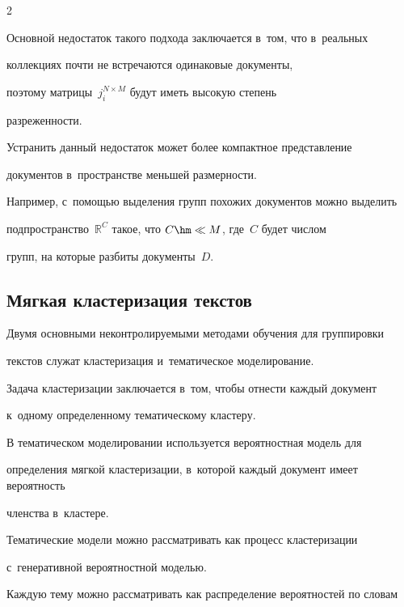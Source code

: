 \begin{multicols}{2}
{    


    }


    


    Основной недостаток такого подхода заключается в~том, что в~реальных 


коллекциях почти не встречаются одинаковые документы,


поэтому мат\-ри\-цы~$j_i^{N \times M}$ будут иметь высокую степень 


разреженности.


        Устранить данный недостаток может более компактное представление 


документов в~пространстве меньшей размерности.


    Например, с~помощью выделения групп похожих документов можно выделить 


подпространство~$\mathbb{R}^C$ такое, что $C \hm\ll M$, где~$C$  будет числом 


групп, на которые разбиты документы~$D$.


    


    \subsection{Мягкая кластеризация текстов}


    


    Двумя основными неконтролируемыми методами обучения для группировки 


текстов служат клас\-те\-ри\-за\-ция и~тематическое моделирование.


    Задача кластеризации заключается в~том, чтобы отнести каждый документ 


    к~одному определенному тематическому кластеру.


    


    В тематическом моделировании  используется вероятностная модель для 


определения мягкой клас\-те\-ри\-за\-ции, в~которой каждый документ имеет вероятность 


членства в~кластере.


    Тематические модели можно рассматривать как процесс кластеризации 


    с~генеративной вероятностной моделью.


    Каж\-дую тему можно рассматривать как распределение вероятностей по словам 



\end{multicols}
